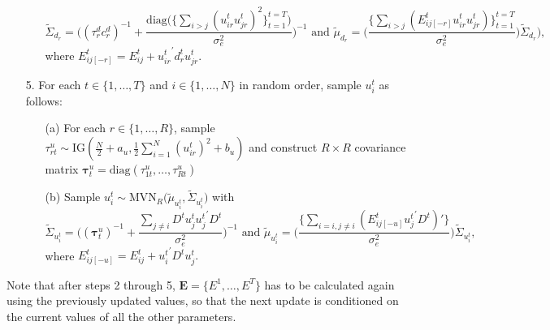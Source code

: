 \documentclass[a4paper]{article}
\begin{document}
\begin{itemize}
\begin{enumerate}
			$$\tilde{\Sigma}_{d_r} = \Big((\tau_r^d{c_r^d})^{-1}+\frac{\mbox{diag}\big(\{\sum_{i>j}({u^t_{ir}u^t_{jr}})^2\}_{t=1}^{t=T}\big)}{\sigma_e^2}\Big)^{-1} \mbox{ and } \tilde{\mu}_{d_r} =  \Big(\frac{\{\sum_{i>j}(E^{t}_{ij[-r]}u^t_{ir}u^t_{jr})\}_{t=1}^{t=T}}{\sigma_e^2}\Big)\tilde{\Sigma}_{d_r}),$$
			where $E^{t}_{ij[-r]}=E^t_{ij}+{u^t_{ir}}^\prime d^t_{r}u^t_{jr}$.
		\end{enumerate}		
		\item [5.] For each $t \in \{1,\ldots,T\}$ and $i \in \{1,\ldots,N\}$ in random order, sample $u^t_{i}$ as follows:
		\begin{enumerate}
			\item[(a)] For each $r \in \{1,\ldots,R\}$, sample $\tau_{rt}^{u} \sim \mbox{IG}(\frac{N}{2}+a_u, \frac{1}{2}\sum\limits_{i=1}^N (u^t_{ir})^2 + b_u)$ and construct $R\times R$ covariance matrix $\boldsymbol{\tau}^u_t = \mbox{diag}(\tau_{1t}^{u},\ldots, \tau_{Rt}^{u})$
					\item [(b)] Sample $u^t_{i}\sim \mbox{MVN}_R\big(\tilde{\mu}_{u^t_{i}}, \tilde{\Sigma}_{u^t_{i}} \big)$ with 
			$$\tilde{\Sigma}_{u^t_{i}} = \Big((\boldsymbol{\tau}^u_t)^{-1}+\frac{\sum_{j\neq i}D^tu^t_{j}{u^t_{j}}^\prime D^t}{\sigma_e^2}\Big)^{-1}\mbox{ and } \tilde{\mu}_{u^t_{i}} = \Big(\frac{\{\sum_{i=i, j\neq i}(E^{t}_{ij[-u]}{u^t_{j}}^\prime D^t)'\}}{{\sigma_e^2}}\Big)\tilde{\Sigma}_{u^t_{i}},$$ 
			where $E^{t}_{ij[-u]}=E^t_{ij}+{u^t_{i}}^\prime D^tu^t_{j}.$
		\end{enumerate}			
	\end{itemize}
	Note that after steps 2 through 5, $\mathbf{E} = \{E^1,\ldots, E^T\}$ has to be calculated again using the previously updated values, so that the next update is conditioned on the current values of all the other parameters. 
\end{document}
